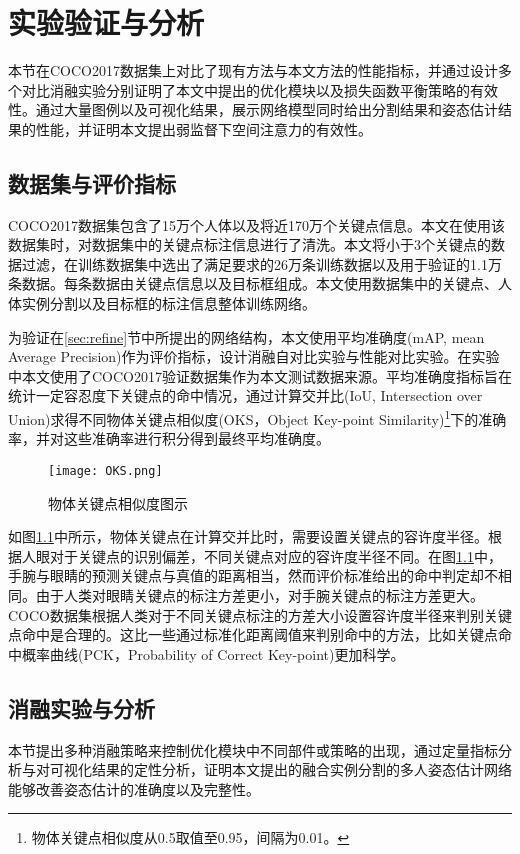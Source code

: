 \chapter{实验验证与分析}
\label{cha:exp}
本节在COCO2017数据集上对比了现有方法与本文方法的性能指标，并通过设计多个对比消融实验分别证明了本文中提出的优化模块以及损失函数平衡策略的有效性。通过大量图例以及可视化结果，展示网络模型同时给出分割结果和姿态估计结果的性能，并证明本文提出弱监督下空间注意力的有效性。
\section{数据集与评价指标}
\label{sec:dataset}
COCO2017数据集\cite{lin2014microsoft}包含了15万个人体以及将近170万个关键点信息。本文在使用该数据集时，对数据集中的关键点标注信息进行了清洗。本文将小于3个关键点的数据过滤，在训练数据集中选出了满足要求的26万条训练数据以及用于验证的1.1万条数据。每条数据由关键点信息以及目标框组成。本文使用数据集中的关键点、人体实例分割以及目标框的标注信息整体训练网络。

为验证在\ref{sec:refine}节中所提出的网络结构，本文使用平均准确度(mAP, mean Average Precision)\cite{zhu2004recall}作为评价指标，设计消融自对比实验与性能对比实验。在实验中本文使用了COCO2017验证数据集作为本文测试数据来源。平均准确度指标旨在统计一定容忍度下关键点的命中情况，通过计算交并比(IoU, Intersection over Union)求得不同物体关键点相似度(OKS，Object Key-point Similarity)\footnote{物体关键点相似度从0.5取值至0.95，间隔为0.01。}下的准确率，并对这些准确率进行积分得到最终平均准确度\cite{ruggero2017benchmarking}。

\begin{figure}
	\centering
	\texttt{[image: OKS.png]}
	\caption{物体关键点相似度图示\cite{ruggero2017benchmarking}}
	\label{fig:oksfigure}
\end{figure}

如图\ref{fig:oksfigure}中所示，物体关键点在计算交并比时，需要设置关键点的容许度半径。根据人眼对于关键点的识别偏差，不同关键点对应的容许度半径不同。在图\ref{fig:oksfigure}中，手腕与眼睛的预测关键点与真值的距离相当，然而评价标准给出的命中判定却不相同。由于人类对眼睛关键点的标注方差更小，对手腕关键点的标注方差更大。COCO数据集根据人类对于不同关键点标注的方差大小设置容许度半径来判别关键点命中是合理的。这比一些通过标准化距离阈值来判别命中的方法，比如关键点命中概率曲线\cite{andriluka20142d}(PCK，Probability of Correct Key-point)更加科学。

\section{消融实验与分析}
\label{sec:ablation}
本节提出多种消融策略来控制优化模块中不同部件或策略的出现，通过定量指标分析与对可视化结果的定性分析，证明本文提出的融合实例分割的多人姿态估计网络能够改善姿态估计的准确度以及完整性。
